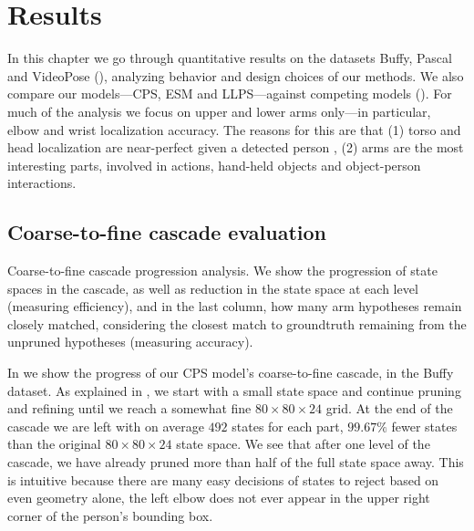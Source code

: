 \chapter{Results}\label{sec:results}

In this chapter we go through quantitative results on the datasets Buffy, 
Pascal and VideoPose (), analyzing behavior and design choices 
of our methods.  We also compare our models---CPS, ESM and LLPS---against 
competing models ().  For much of the analysis we focus on 
upper and lower arms only---in particular, elbow and wrist localization 
accuracy.  The reasons for this are that (1) torso and head localization are 
near-perfect given a detected person \citep{deva2011}, (2) arms are the most 
interesting parts, involved in actions, hand-held objects and object-person 
interactions.


\section{Coarse-to-fine cascade evaluation}\label{sec:cascade-eval}
 \begin{table}[tb]
\begin{center}

\caption[Coarse-to-fine cascade progression analysis.]{Coarse-to-fine cascade 
progression analysis. We show the progression of state spaces in the cascade, 
as well as reduction in the state space at each level (measuring efficiency), 
and in the last column, how many arm hypotheses remain closely matched, 
considering the closest match to groundtruth remaining from the unpruned 
hypotheses (measuring accuracy). }
\label{tab:c2f} 
\end{center}
\end{table}

In  we show the progress of our CPS model's coarse-to-fine cascade, 
in the Buffy dataset.
As explained in , we start with a small state space and 
continue pruning and refining until we reach a somewhat fine $80 \times 80 
\times 24$ grid.  At the end of the cascade we are left with on average $492$ 
states for each part, $99.67\%$ fewer states than the original $80 \times 80 
\times 24$ state space. We see that after one level of the cascade, we have 
already pruned more than half of the full state space away.  This 
is intuitive because there are many easy decisions of states to reject based on 
even geometry alone, \eg the left elbow does not ever appear in the upper right 
corner of the person's bounding box.

